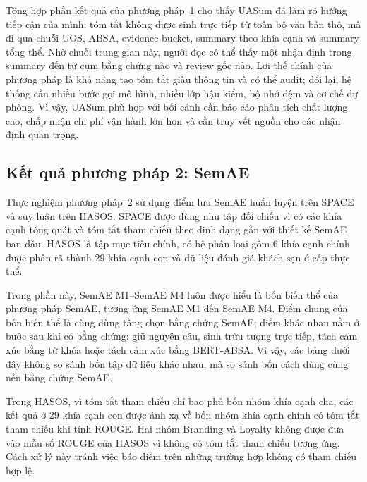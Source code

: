 Tổng hợp phần kết quả của phương pháp~1 cho thấy UASum đã làm rõ hướng tiếp cận
của mình: tóm tắt không được sinh trực tiếp từ toàn bộ văn bản thô, mà đi qua
chuỗi UOS, ABSA, evidence bucket, summary theo khía cạnh và summary tổng thể.
Nhờ chuỗi trung gian này, người đọc có thể thấy một nhận định trong summary
đến từ cụm bằng chứng nào và review gốc nào. Lợi thế chính của phương pháp là
khả năng tạo tóm tắt giàu thông tin và có thể audit; đổi lại, hệ thống cần
nhiều bước gọi mô hình, nhiều lớp hậu kiểm, bộ nhớ đệm và cơ chế dự phòng. Vì
vậy, UASum phù hợp với bối cảnh cần báo cáo phân tích chất lượng cao, chấp nhận
chi phí vận hành lớn hơn và cần truy vết nguồn cho các nhận định quan trọng.

\subsection{Kết quả phương pháp 2: SemAE}
\label{subsec:method2}
Thực nghiệm phương pháp~2 sử dụng điểm lưu SemAE huấn luyện trên SPACE và suy luận trên HASOS. SPACE được dùng như tập đối chiếu vì có các khía cạnh tổng quát và tóm tắt tham chiếu theo định dạng gần với thiết kế SemAE ban đầu. HASOS là tập mục tiêu chính, có hệ phân loại gồm 6 khía cạnh chính được phân rã thành 29 khía cạnh con và dữ liệu đánh giá khách sạn ở cấp thực thể.

Trong phần này, SemAE M1--SemAE M4 luôn được hiểu là bốn biến thể của phương pháp SemAE, tương ứng SemAE M1 đến SemAE M4. Điểm chung của bốn biến thể là cùng dùng tầng chọn bằng chứng SemAE; điểm khác nhau nằm ở bước sau khi có bằng chứng: giữ nguyên câu, sinh trừu tượng trực tiếp, tách cảm xúc bằng từ khóa hoặc tách cảm xúc bằng BERT-ABSA. Vì vậy, các bảng dưới đây không so sánh bốn tập dữ liệu khác nhau, mà so sánh bốn cách dùng cùng nền bằng chứng SemAE.

Trong HASOS, vì tóm tắt tham chiếu chỉ bao phủ bốn nhóm khía cạnh cha, các kết quả ở 29 khía cạnh con được ánh xạ về bốn nhóm khía cạnh chính có tóm tắt tham chiếu khi tính ROUGE. Hai nhóm Branding và Loyalty không được đưa vào mẫu số ROUGE của HASOS vì không có tóm tắt tham chiếu tương ứng. Cách xử lý này tránh việc báo điểm trên những trường hợp không có tham chiếu hợp lệ.

